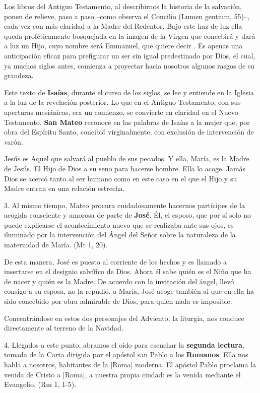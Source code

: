 \begin{body}
\begin{body}
Los libros del Antiguo Testamento, al describirnos la historia de la salvación, ponen de relieve, paso a paso --como observa el Concilio (Lumen gentium, 55)--, cada vez con más claridad a la Madre del Redentor. Bajo este haz de luz ella queda proféticamente bosquejada en la imagen de la Virgen que concebirá y dará a luz un Hijo, cuyo nombre será Emmanuel, que quiere decir . Es apenas una anticipación eficaz para prefigurar un ser sin igual predestinado por Dios, el cual, ya muchos siglos antes, comienza a proyectar hacia nosotros algunos rasgos de su grandeza.

Este texto de \textbf{Isaías}, durante el curso de los siglos, se lee y entiende en la Iglesia a la luz de la revelación posterior. Lo que en el Antiguo Testamento, con sus aperturas mesiánicas, era un comienzo, se convierte en claridad en el Nuevo Testamento. \textbf{San Mateo} reconoce en las palabras de Isaías a la mujer que, por obra del Espíritu Santo, concibió virginalmente, con exclusión de intervención de varón.

Jesús es Aquel que salvará al pueblo de sus pecados. Y ella, María, es la Madre de Jesús. El Hijo de Dios  a su seno para hacerse hombre. Ella lo acoge. Jamás Dios se acercó tanto al ser humano como en este caso en el que el Hijo y su Madre entran en una relación estrecha.

3. Al mismo tiempo, Mateo procura cuidadosamente hacernos partícipes de la acogida consciente y amorosa de parte de \textbf{José}. Él, el esposo, que por sí solo no puede explicarse el acontecimiento nuevo que se realizaba ante sus ojos, es iluminado por la intervención del Ángel del Señor sobre la naturaleza de la maternidad de María.  (Mt 1, 20).

De esta manera, José es puesto al corriente de los hechos y es llamado a insertarse en el designio salvífico de Dios. Ahora él sabe quién es el Niño que ha de nacer y quién es la Madre. De acuerdo con la invitación del ángel, llevó consigo a su esposa, no la repudió.  a María, José acoge también al que en ella ha sido concebido por obra admirable de Dios, para quien nada es imposible.

Concentrándose en estos dos personajes del Adviento, la liturgia, nos conduce directamente al terreno de la Navidad.

4. Llegados a este punto, abramos el oído para escuchar la \textbf{segunda lectura}, tomada de la Carta dirigida por el apóstol san Pablo a los \textbf{Romanos}. Ella nos habla a nosotros, habitantes de la {[}Roma{]} moderna. El apóstol Pablo proclama la venida de Cristo a {[}Roma{]}, a nuestra propia ciudad: es la venida mediante el Evangelio,  (Rm 1, 1-5).


\end{body}
\end{body}
